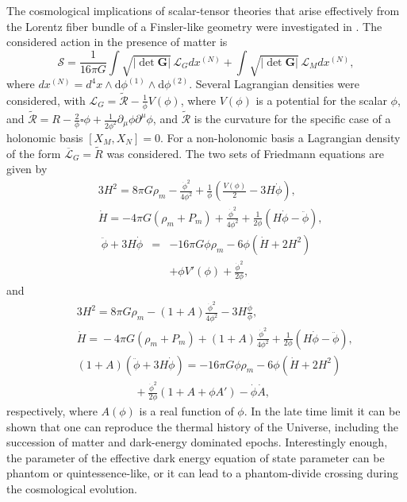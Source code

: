 \documentclass[aps,superscriptaddress, showpacs,preprintnumbers, superscriptaddress, nofootinbibt,twocolumn]{revtex4-2}
\def\bea{\begin{eqnarray}}
\def\eea{\end{eqnarray}}
\newcommand{\de}{\mathrm{d}}
\begin{document}
The cosmological implications of scalar-tensor theories that arise effectively from the Lorentz fiber bundle of a Finsler-like geometry were investigated in \cite{Fc19a}. The considered action in the presence of matter is
\begin{equation}
\mathcal S = \frac{1}{16\pi G} \int \sqrt{|\det\mathbf G|}\,\mathcal L_G dx^{(N)}+ \int
\sqrt{|\det\mathbf G|}\,\mathcal L_M dx^{(N)},
\end{equation}
where $dx^{(N)} = d^4x\wedge\de\phi^{(1)}\wedge\de\phi^{(2)}$. Several Lagrangian densities were considered,  with
$\mathcal L_G = \mathcal{\tilde R} - \frac{1}{\phi}V(\phi)$,
where $V(\phi)$ is a potential for the scalar $\phi$, and
$\mathcal{\tilde R} = R - \frac{2}{\phi}\square \phi +
\frac{1}{2\phi^2}\partial_\mu\phi\partial^\mu\phi$, and $\mathcal{\tilde R}$
is the curvature for the specific case of a holonomic basis $
[X_M,X_N] = 0 $. For  a non-holonomic basis a Lagrangian density of the form
$\overline{\mathcal L}_G = \tilde R$ was considered. The two sets of Friedmann equations are given by
\begin{align}
    & 3H^2 = 8\pi G\rho_m - \frac{\dot\phi^2}{4\phi^2} +\frac{1}{\phi}\left( \frac{V(\phi)}{2}
-
3H \dot\phi\right)  \label{hol fried 1}, \\
    & \dot H = -4\pi G(\rho_m+P_m)  + \frac{\dot\phi^2}{4\phi^2} + \frac{1}{2\phi}\left(
H\dot\phi- \ddot\phi\right)\label{hol fried 2},
\end{align}
\bea
     \ddot\phi + 3H\dot\phi &=& - 16\pi G \phi \mathcal \rho_m - 6\phi\left(\dot H +2H^2
\right) \nonumber\\
&&+ \phi V'(\phi) + \frac{\dot\phi^2}{2\phi},
\eea
and
\begin{eqnarray}
  &&
  \!\!\!\!  \!\!\!\!\!\!\!\!
  3H^2 = 8\pi G\rho_m - (1+A)\frac{\dot\phi^2}{4\phi^2} - 3H
\frac{\dot\phi}{\phi}
\label{nonhol fried 1},\\
&&\!\!\!\!  \!\!\!\!\!\!\!\!
    \dot H = \! -4\pi G(\rho_m\!+\!P_m) + (1\!+\!A)\frac{\dot\phi^2}{4\phi^2} +
\frac{1}{2\phi}
\left(H\dot\phi\! - \!\ddot\phi\right)\!,
\\
  && \!\!\!\! \!\! \!\! \!\!\!\!(1+A)\left( \ddot\phi + 3H\dot\phi \right) =  - 16\pi G
\phi \mathcal \rho_m -
6\phi\left(\dot H +2H^2 \right) \nonumber\\
    &&\,
    \ \ \     \ \ \     \ \ \     \ \ \     \ \ \     \ \ \     \ \ \     \  \,
    + \frac{\dot\phi^2}{2\phi}\left( 1+A+\phi A' \right) - \dot\phi \dot A
     \label{nonhol fried 3},
\end{eqnarray}
respectively, where $A(\phi)$ is a real function of $\phi$.  In the late time limit it can be shown that one can reproduce the
thermal history of the Universe, including the succession of matter and dark-energy dominated epochs. Interestingly enough, the parameter of the effective dark energy equation of state parameter can be phantom or quintessence-like, or it can lead to a phantom-divide crossing during the cosmological evolution.
\end{document}

